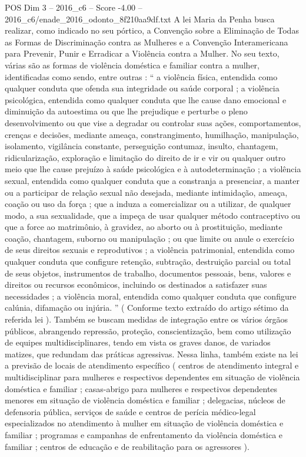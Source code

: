 \begin{textsample}{POS Dim 3 – 2016\_c6 – Score -4.00 – 2016\_c6/enade\_2016\_odonto\_8f210aa9df.txt}
A lei Maria da Penha busca realizar, como indicado no seu pórtico, a Convenção sobre a Eliminação de Todas as Formas de Discriminação contra as Mulheres e a Convenção Interamericana para Prevenir, Punir e Erradicar a Violência contra a Mulher.
No seu texto, várias são as formas de violência doméstica e familiar contra a mulher, identificadas como sendo, entre outras : “ a violência física, entendida como qualquer conduta que ofenda sua integridade ou saúde corporal ; a violência psicológica, entendida como qualquer conduta que lhe cause dano emocional e diminuição da autoestima ou que lhe prejudique e perturbe o pleno desenvolvimento ou que vise a degradar ou controlar suas ações, comportamentos, crenças e decisões, mediante ameaça, constrangimento, humilhação, manipulação, isolamento, vigilância constante, perseguição contumaz, insulto, chantagem, ridicularização, exploração e limitação do direito de ir e vir ou qualquer outro meio que lhe cause prejuízo à saúde psicológica e à autodeterminação ; a violência sexual, entendida como qualquer conduta que a constranja a presenciar, a manter ou a participar de relação sexual não desejada, mediante intimidação, ameaça, coação ou uso da força ; que a induza a comercializar ou a utilizar, de qualquer modo, a sua sexualidade, que a impeça de usar qualquer método contraceptivo ou que a force ao matrimônio, à gravidez, ao aborto ou à prostituição, mediante coação, chantagem, suborno ou manipulação ; ou que limite ou anule o exercício de seus direitos sexuais e reprodutivos ; a violência patrimonial, entendida como qualquer conduta que configure retenção, subtração, destruição parcial ou total de seus objetos, instrumentos de trabalho, documentos pessoais, bens, valores e direitos ou recursos econômicos, incluindo os destinados a satisfazer suas necessidades ; a violência moral, entendida como qualquer conduta que configure calúnia, difamação ou injúria. ” ( Conforme texto extraído do artigo sétimo da referida lei ).
Também se buscam medidas de integração entre os vários órgãos públicos, abrangendo repressão, proteção, conscientização, bem como utilização de equipes multidisciplinares, tendo em vista os graves danos, de variados matizes, que redundam das práticas agressivas.
Nessa linha, também existe na lei a previsão de locais de atendimento específico ( centros de atendimento integral e multidisciplinar para mulheres e respectivos dependentes em situação de violência doméstica e familiar ; casas-abrigo para mulheres e respectivos dependentes menores em situação de violência doméstica e familiar ; delegacias, núcleos de defensoria pública, serviços de saúde e centros de perícia médico-legal especializados no atendimento à mulher em situação de violência doméstica e familiar ; programas e campanhas de enfrentamento da violência doméstica e familiar ; centros de educação e de reabilitação para os agressores ).

\end{textsample}

